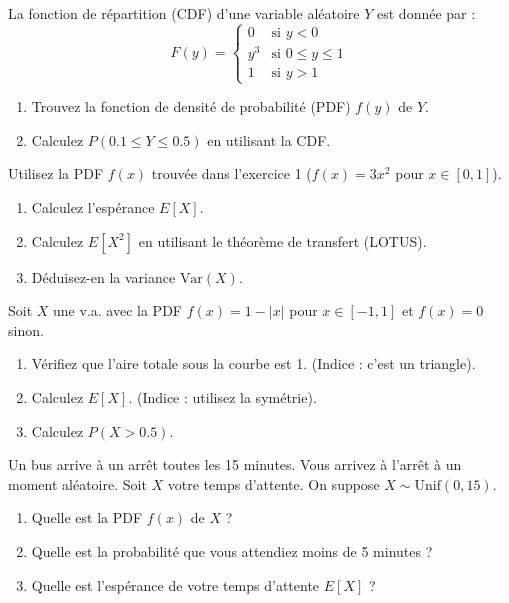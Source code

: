 \begin{exercicebox}
La fonction de répartition (CDF) d'une variable aléatoire $Y$ est donnée par :
$$ F(y) = \begin{cases} 0 & \text{si } y < 0 \\ y^3 & \text{si } 0 \le y \le 1 \\ 1 & \text{si } y > 1 \end{cases} $$
\begin{enumerate}
    \item Trouvez la fonction de densité de probabilité (PDF) $f(y)$ de $Y$.
    \item Calculez $P(0.1 \le Y \le 0.5)$ en utilisant la CDF.
\end{enumerate}
\end{exercicebox}

\begin{exercicebox}
Utilisez la PDF $f(x)$ trouvée dans l'exercice 1 ($f(x) = 3x^2$ pour $x \in [0, 1]$).
\begin{enumerate}
    \item Calculez l'espérance $E[X]$.
    \item Calculez $E[X^2]$ en utilisant le théorème de transfert (LOTUS).
    \item Déduisez-en la variance $\text{Var}(X)$.
\end{enumerate}
\end{exercicebox}

\begin{exercicebox}
Soit $X$ une v.a. avec la PDF $f(x) = 1 - |x|$ pour $x \in [-1, 1]$ et $f(x)=0$ sinon.
\begin{enumerate}
    \item Vérifiez que l'aire totale sous la courbe est 1. (Indice : c'est un triangle).
    \item Calculez $E[X]$. (Indice : utilisez la symétrie).
    \item Calculez $P(X > 0.5)$.
\end{enumerate}
\end{exercicebox}


\begin{exercicebox}
Un bus arrive à un arrêt toutes les 15 minutes. Vous arrivez à l'arrêt à un moment aléatoire. Soit $X$ votre temps d'attente. On suppose $X \sim \text{Unif}(0, 15)$.
\begin{enumerate}
    \item Quelle est la PDF $f(x)$ de $X$ ?
    \item Quelle est la probabilité que vous attendiez moins de 5 minutes ?
    \item Quelle est l'espérance de votre temps d'attente $E[X]$ ?
\end{enumerate}
\end{exercicebox}

